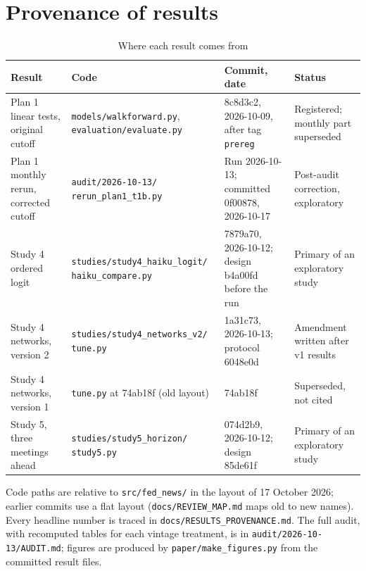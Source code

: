 \documentclass[11pt]{article}
\begin{document}
\section{Provenance of results}\label{app:prov}

\begin{table}[ht]\centering\small
\caption{Where each result comes from}\label{tab:prov}
\begin{tabular}{p{4.6cm}p{3.6cm}p{3.4cm}p{3.2cm}}
\toprule
Result & Code & Commit, date & Status \\ \midrule
Plan 1 linear tests, original cutoff & \texttt{models/walkforward.py}, \texttt{evaluation/evaluate.py} & 8c8d3c2, 2026-10-09, after tag \texttt{prereg} & Registered; monthly part superseded \\
Plan 1 monthly rerun, corrected cutoff & \texttt{audit/2026-10-13/ rerun\_plan1\_t1b.py} & Run 2026-10-13; committed 0f00878, 2026-10-17 & Post-audit correction, exploratory \\
Study 4 ordered logit & \texttt{studies/study4\_haiku\_logit/ haiku\_compare.py} & 7879a70, 2026-10-12; design b4a00fd before the run & Primary of an exploratory study \\
Study 4 networks, version 2 & \texttt{studies/study4\_networks\_v2/ tune.py} & 1a31c73, 2026-10-13; protocol 6048e0d & Amendment written after v1 results \\
Study 4 networks, version 1 & \texttt{tune.py} at 74ab18f (old layout) & 74ab18f & Superseded, not cited \\
Study 5, three meetings ahead & \texttt{studies/study5\_horizon/ study5.py} & 074d2b9, 2026-10-12; design 85de61f & Primary of an exploratory study \\
\bottomrule
\end{tabular}
\end{table}

\noindent Code paths are relative to \texttt{src/fed\_news/} in the layout of 17 October 2026; earlier commits use a flat layout (\texttt{docs/REVIEW\_MAP.md} maps old to new names). Every headline number is traced in \texttt{docs/RESULTS\_PROVENANCE.md}. The full audit, with recomputed tables for each vintage treatment, is in
\texttt{audit/2026-10-13/AUDIT.md}; figures are produced by \texttt{paper/make\_figures.py} from the committed
result files.
\end{document}
